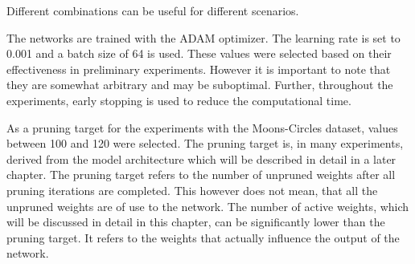 Different combinations can be useful for different scenarios.

The networks are trained with the ADAM optimizer.
The learning rate is set to 0.001 and a batch size of 64 is used.
These values were selected based on their effectiveness in preliminary experiments. However it is important to note that they are somewhat arbitrary and may be suboptimal.
Further, throughout the experiments, early stopping is used to reduce the computational time.

As a pruning target for the experiments with the Moons-Circles dataset, values between 100 and 120 were selected.
The pruning target is, in many experiments, derived from the model architecture which will be described in detail in a later chapter.
The pruning target refers to the number of unpruned weights after all pruning iterations are completed.
This however does not mean, that all the unpruned weights are of use to the network.
The number of active weights, which will be discussed in detail in this chapter, can be significantly lower than the pruning target.
It refers to the weights that actually influence the output of the network.

